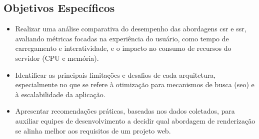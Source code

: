 \subsection{Objetivos Específicos}
\begin{itemize}
\item Realizar uma análise comparativa do desempenho das abordagens \acrshort{csr} e \acrshort{ssr}, avaliando métricas focadas na experiência do usuário, como tempo de carregamento e interatividade, e o impacto no consumo de recursos do servidor (CPU e memória).

\item Identificar as principais limitações e desafios de cada arquitetura, especialmente no que se refere à otimização para mecanismos de busca (\acrshort{seo}) e à escalabilidade da aplicação.

\item Apresentar recomendações práticas, baseadas nos dados coletados, para auxiliar equipes de desenvolvimento a decidir qual abordagem de renderização se alinha melhor aos requisitos de um projeto web.
\end{itemize}





